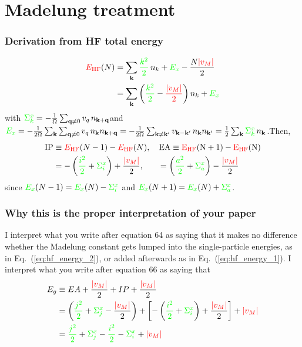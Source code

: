 \section{Madelung treatment }
\begin{frame}
    \frametitle{Derivation from HF total energy}
\begin{align}
    \textcolor{red}{E_{\rm HF}}(N) &= \sum_{\mathbf k} \textcolor{green}{\frac{k^2}{2}}\, n_k + \textcolor{green}{E_x} - \frac{N\textcolor{red}{|v_M|}}{2} \label{eq:hf_energy_1} \\
    &= \sum_{\mathbf k} \left(\textcolor{green}{\frac{k^2}{2}} - \textcolor{red}{\frac{|v_M|}{2}}\right) n_k + \textcolor{green}{E_x} \label{eq:hf_energy_2}
\end{align}\pause
with $
    \textcolor{green}{\Sigma^x_k} = -\frac{1}{\Omega}\sum_{\mathbf{q}\neq0} v_q\, n_{\mathbf{k}+\mathbf{q}}$\pause and
$    \textcolor{green}{E_x} = -\frac{1}{2\Omega}\sum_{\mathbf{k}}\sum_{\mathbf{q}\neq0} v_q\, n_{\mathbf{k}} n_{\mathbf{k}+\mathbf{q}}
    = -\frac{1}{2\Omega}\sum_{\mathbf{k}\neq\mathbf{k}'} v_{\mathbf{k}-\mathbf{k}'}\, n_{\mathbf{k}} n_{\mathbf{k}'}
    = \frac{1}{2}\sum_{\mathbf{k}}\textcolor{green}{\Sigma^x_k}\, n_{\mathbf{k}}$.\pause Then,
\begin{align}
    \rm IP &\equiv \textcolor{red}{E_{\rm HF}}(N-1) - \textcolor{red}{E_{\rm HF}}(N), \quad     \rm EA \equiv \textcolor{red}{E_{\rm HF}}(N+1) - \textcolor{red}{E_{\rm HF}}(N)\\
    &= -\left(\textcolor{green}{\frac{i^2}{2}} + \textcolor{green}{\Sigma^x_i}\right) + \frac{\textcolor{red}{|v_M|}}{2}, \qquad =\left(\textcolor{green}{\frac{a^2}{2}} + \textcolor{green}{\Sigma^x_a}\right) - \frac{\textcolor{red}{|v_M|}}{2} 
\end{align} \pause
since $
    \textcolor{green}{E_x}(N-1)
    = \textcolor{green}{E_x}(N) - \textcolor{green}{\Sigma^x_i}$ and $
    \textcolor{green}{E_x}(N+1)
    = \textcolor{green}{E_x}(N) + \textcolor{green}{\Sigma^x_a}$.
\end{frame}
\begin{frame}
    \frametitle{Why this is the proper interpretation of your paper }
 I interpret what you write after equation 64 as saying that it makes no difference whether the Madelung constant gets lumped into the single-particle energies, as in Eq.~(\ref{eq:hf_energy_2}), or added afterwards as in Eq.~(\ref{eq:hf_energy_1}). \pause I interpret what you write after equation 66 as saying that 
\begin{align}
    E_g &\equiv EA + \frac{\textcolor{red}{|v_M|}}{2} + IP + \frac{\textcolor{red}{|v_M|}}{2}\\
    &= \left(\textcolor{green}{\frac{j^2}{2}} + \textcolor{green}{\Sigma^x_j} - \frac{\textcolor{red}{|v_M|}}{2}\right) + \left[-\left(\textcolor{green}{\frac{i^2}{2}} + \textcolor{green}{\Sigma^x_i}\right) + \frac{\textcolor{red}{|v_M|}}{2}\right]+ \textcolor{red}{|v_M|}\\
&= \textcolor{green}{\frac{j^2}{2}} + \textcolor{green}{\Sigma^x_j} - \textcolor{green}{\frac{i^2}{2}} - \textcolor{green}{\Sigma^x_i} + \textcolor{red}{|v_M|} \label{eq:band_gap_madelung}
\end{align}
\end{frame}
